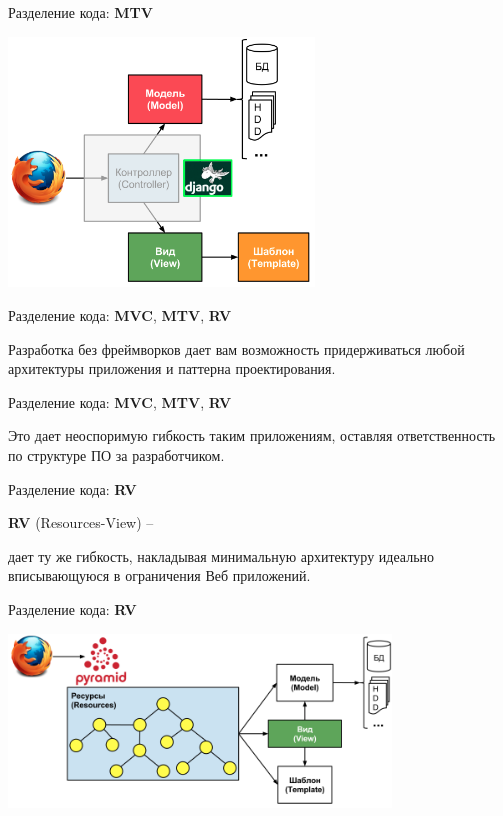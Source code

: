 \begin{frame}{Разделение кода: \textbf{MTV}}

  \begin{center}
    \includegraphics[width=3.2in]{media/mtv.png}
  \end{center}

\end{frame}

\begin{frame}{Разделение кода: \textbf{MVC}, \textbf{MTV}, \textbf{RV}}

  Разработка без фреймворков дает вам возможность придерживаться любой
  архитектуры приложения и паттерна проектирования.

\end{frame}

\begin{frame}{Разделение кода: \textbf{MVC}, \textbf{MTV}, \textbf{RV}}

  Это дает неоспоримую гибкость таким приложениям, оставляя ответственность по
  структуре ПО за разработчиком.

\end{frame}


\begin{frame}{Разделение кода: \textbf{RV}}

  \textbf{RV} (Resources-View) --

  дает ту же гибкость, накладывая минимальную архитектуру идеально
  вписывающуюся в ограничения Веб приложений.

\end{frame}


\begin{frame}{Разделение кода: \textbf{RV}}

  \begin{center}
    \includegraphics[width=4.0in]{media/rv.png}
  \end{center}

\end{frame}



